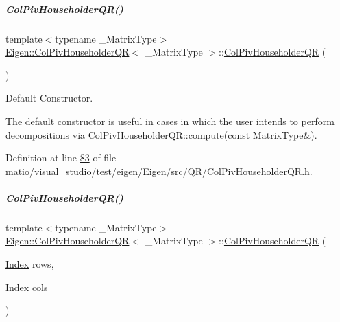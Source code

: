 \mbox{\label{group___q_r___module_a9d8a92c2a2f0debe5454812372237ed4}} 
\subparagraph{\texorpdfstring{Col\+Piv\+Householder\+Q\+R()}{ColPivHouseholderQR()}\hspace{0.1cm}{\footnotesize\ttfamily [5/8]}}
{\footnotesize\ttfamily template$<$typename \+\_\+\+Matrix\+Type$>$ \\
\hyperlink{group___q_r___module_class_eigen_1_1_col_piv_householder_q_r}{Eigen\+::\+Col\+Piv\+Householder\+QR}$<$ \+\_\+\+Matrix\+Type $>$\+::\hyperlink{group___q_r___module_class_eigen_1_1_col_piv_householder_q_r}{Col\+Piv\+Householder\+QR} (\begin{DoxyParamCaption}{ }\end{DoxyParamCaption})\hspace{0.3cm}{\ttfamily [inline]}}



Default Constructor. 

The default constructor is useful in cases in which the user intends to perform decompositions via Col\+Piv\+Householder\+Q\+R\+::compute(const Matrix\+Type\&). 

Definition at line \hyperlink{matio_2visual__studio_2test_2eigen_2_eigen_2src_2_q_r_2_col_piv_householder_q_r_8h_source_l00083}{83} of file \hyperlink{matio_2visual__studio_2test_2eigen_2_eigen_2src_2_q_r_2_col_piv_householder_q_r_8h_source}{matio/visual\+\_\+studio/test/eigen/\+Eigen/src/\+Q\+R/\+Col\+Piv\+Householder\+Q\+R.\+h}.

\mbox{\label{group___q_r___module_a5965d4fdebc04b2df71d67ff0b2d0c2c}} 
\subparagraph{\texorpdfstring{Col\+Piv\+Householder\+Q\+R()}{ColPivHouseholderQR()}\hspace{0.1cm}{\footnotesize\ttfamily [6/8]}}
{\footnotesize\ttfamily template$<$typename \+\_\+\+Matrix\+Type$>$ \\
\hyperlink{group___q_r___module_class_eigen_1_1_col_piv_householder_q_r}{Eigen\+::\+Col\+Piv\+Householder\+QR}$<$ \+\_\+\+Matrix\+Type $>$\+::\hyperlink{group___q_r___module_class_eigen_1_1_col_piv_householder_q_r}{Col\+Piv\+Householder\+QR} (\begin{DoxyParamCaption}\item[{\hyperlink{namespace_eigen_a62e77e0933482dafde8fe197d9a2cfde}{Index}}]{rows,  }\item[{\hyperlink{namespace_eigen_a62e77e0933482dafde8fe197d9a2cfde}{Index}}]{cols }\end{DoxyParamCaption})\hspace{0.3cm}{\ttfamily [inline]}}



